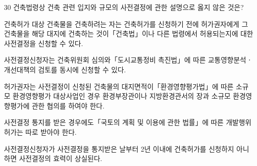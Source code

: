 \begin{question}{30}
건축법령상 건축 관련 입지와 규모의 사전결정에 관한 설명으로 옳지 않은 것은?
\begin{choices}
  \item 건축허가 대상 건축물을 건축하려는 자는 건축허가를 신청하기 전에 허가권자에게 그 건축물을 해당 대지에 건축하는 것이「건축법」이나 다른 법령에서 허용되는지에 대한 사전결정을 신청할 수 있다.
  \item 사전결정신청자는 건축위원회 심의와「도시교통정비 촉진법」에 따른 교통영향분석ㆍ개선대책의 검토를 동시에 신청할 수 있다.
  \item 허가권자는 사전결정이 신청된 건축물의 대지면적이「환경영향평가법」에 따른 소규모 환경영향평가 대상사업인 경우 환경부장관이나 지방환경관서의 장과 소규모 환경영향평가에 관한 협의를 하여야 한다.
  \item 사전결정 통지를 받은 경우에도「국토의 계획 및 이용에 관한 법률」에 따른 개발행위허가는 따로 받아야 한다.
  \item 사전결정신청자가 사전결정을 통지받은 날부터 2년 이내에 건축허가를 신청하지 아니하면 사전결정의 효력이 상실된다.
\end{choices}
\end{question}
